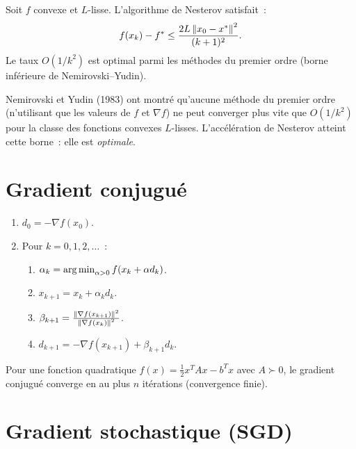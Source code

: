 \begin{theoreme}
\label{thm:nesterov}
Soit $f$ convexe et $L$-lisse. L'algorithme de Nesterov satisfait~:
\[
    f(x_k) - f^* \leq \frac{2L\left\| x_0 - x^* \right\|^2}{(k+1)^2}.
\]
Le taux $O(1/k^2)$ est optimal parmi les m\'ethodes du premier ordre
(borne inf\'erieure de Nemirovski--Yudin).
\end{theoreme}

\begin{attention}[title=\textbf{Optimalit\'e du taux $O(1/k^2)$}]
Nemirovski et Yudin (1983) ont montr\'e qu'aucune m\'ethode du premier ordre
(n'utilisant que les valeurs de $f$ et $\nabla f$) ne peut converger plus vite que
$O(1/k^2)$ pour la classe des fonctions convexes $L$-lisses. L'acc\'el\'eration de
Nesterov atteint cette borne~: elle est \emph{optimale}.
\end{attention}

\section{Gradient conjugu\'e}

\begin{algorithme}[title=\textbf{Gradient conjugu\'e non lin\'eaire (Fletcher--Reeves)}]
\begin{enumerate}
    \item $d_0 = -\nabla f(x_0)$.
    \item Pour $k = 0, 1, 2, \ldots$~:
    \begin{enumerate}
        \item $\alpha_k = \operatorname*{arg\,min}_{\alpha > 0} f(x_k + \alpha d_k)$.
        \item $x_{k+1} = x_k + \alpha_k d_k$.
        \item $\beta_{k+1} = \frac{\left\| \nabla f(x_{k+1}) \right\|^2}{\left\| \nabla f(x_k) \right\|^2}$.
        \item $d_{k+1} = -\nabla f(x_{k+1}) + \beta_{k+1} d_k$.
    \end{enumerate}
\end{enumerate}
\end{algorithme}

\begin{remarque}
Pour une fonction quadratique $f(x) = \frac{1}{2}x^TAx - b^Tx$ avec $A \succ 0$,
le gradient conjugu\'e converge en au plus $n$ it\'erations (convergence finie).
\end{remarque}

\section{Gradient stochastique (SGD)}

